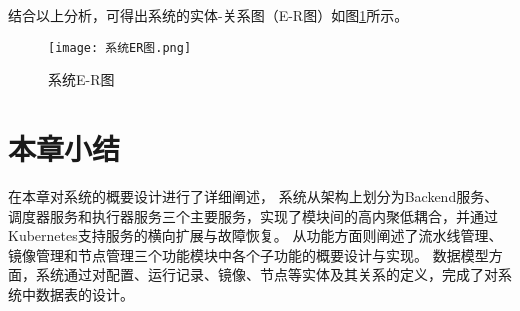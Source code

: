 结合以上分析，可得出系统的实体-关系图（E-R图）如图\ref{fig:系统E-R图}所示。

\begin{figure}[h]
  \centering
  \texttt{[image: 系统ER图.png]}
  \caption{系统E-R图}
  \label{fig:系统E-R图}
\end{figure}

\section{本章小结}

在本章对系统的概要设计进行了详细阐述，
系统从架构上划分为Backend服务、调度器服务和执行器服务三个主要服务，实现了模块间的高内聚低耦合，并通过Kubernetes支持服务的横向扩展与故障恢复。
从功能方面则阐述了流水线管理、镜像管理和节点管理三个功能模块中各个子功能的概要设计与实现。
数据模型方面，系统通过对配置、运行记录、镜像、节点等实体及其关系的定义，完成了对系统中数据表的设计。
